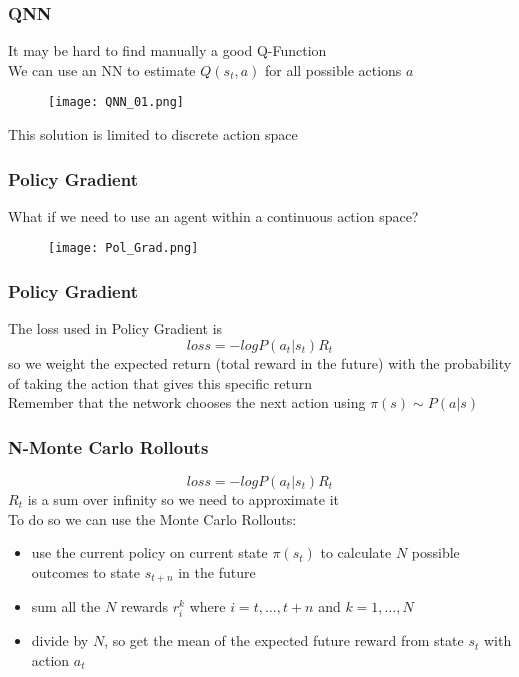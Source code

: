 \documentclass{beamer}
\begin{document}

\begin{frame}
\frametitle{QNN}
It may be hard to find manually a good Q-Function
\\
We can use an NN to estimate $Q(s_t, a)$ for all possible actions $a$
\begin{figure}[ht]
  \texttt{[image: QNN\_01.png]}
\end{figure}
This solution is limited to discrete action space
\end{frame}

\begin{frame}
\frametitle{Policy Gradient}
What if we need to use an agent within a continuous action space?
\begin{figure}[ht]
  \texttt{[image: Pol\_Grad.png]}
\end{figure}
\end{frame}

\begin{frame}
\frametitle{Policy Gradient}
The loss used in Policy Gradient is
$$
loss = - logP(a_t| s_t) R_t
$$
so we weight the expected return (total reward in the future) with the probability of taking the action that gives this specific return
\\
\vspace{1cm}
Remember that the network chooses the next action using $\pi (s) \sim P(a|s)$
\end{frame}

\begin{frame}
\frametitle{N-Monte Carlo Rollouts}
$$
loss = - logP(a_t| s_t) R_t
$$
$R_t$ is a sum over infinity so we need to approximate it
\\
To do so we can use the Monte Carlo Rollouts:
\begin{itemize}
  \item use the current policy on current state $\pi(s_t)$ to calculate $N$ possible outcomes to state $s_{t+n}$ in the future
  \item sum all the $N$ rewards $r_i^k$ where $i=t, \dots, t+n$ and $k = 1, \dots, N$
  \item divide by $N$, so get the mean of the expected future reward from state $s_t$ with action $a_t$
\end{itemize}
\end{frame}
\end{document}
